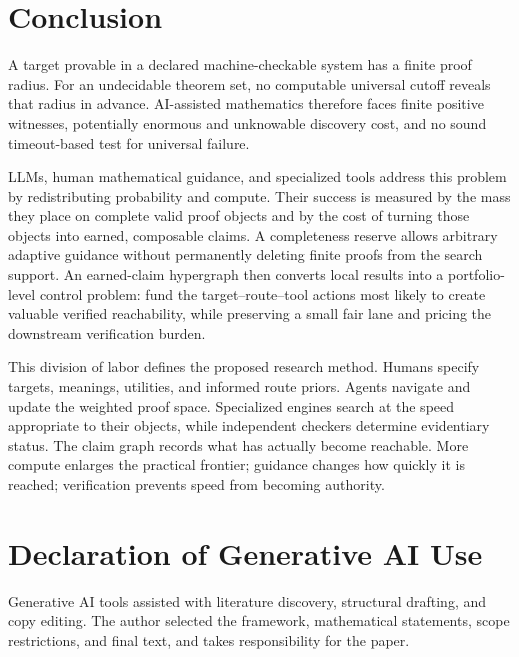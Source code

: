 \documentclass[11pt]{article}
\begin{document}
\section{Conclusion}

A target provable in a declared machine-checkable system has a finite proof
radius.  For an undecidable theorem set, no computable universal cutoff reveals
that radius in advance.  AI-assisted mathematics therefore faces finite
positive witnesses, potentially enormous and unknowable discovery cost, and no
sound timeout-based test for universal failure.

LLMs, human mathematical guidance, and specialized tools address this problem
by redistributing probability and compute.  Their success is measured by the
mass they place on complete valid proof objects and by the cost of turning
those objects into earned, composable claims.  A completeness reserve allows
arbitrary adaptive guidance without permanently deleting finite proofs from
the search support.  An earned-claim hypergraph then converts local results
into a portfolio-level control problem: fund the target--route--tool actions
most likely to create valuable verified reachability, while preserving a
small fair lane and pricing the downstream verification burden.

This division of labor defines the proposed research method.  Humans specify
targets, meanings, utilities, and informed route priors.  Agents navigate and
update the weighted proof space.  Specialized engines search at the speed
appropriate to their objects, while independent checkers determine evidentiary
status.  The claim graph records what has actually become reachable.  More
compute enlarges the practical frontier; guidance changes how quickly it is
reached; verification prevents speed from becoming authority.

\section*{Declaration of Generative AI Use}

Generative AI tools assisted with literature discovery, structural drafting,
and copy editing.  The author selected the framework, mathematical statements,
scope restrictions, and final text, and takes responsibility for the paper.



\end{document}

